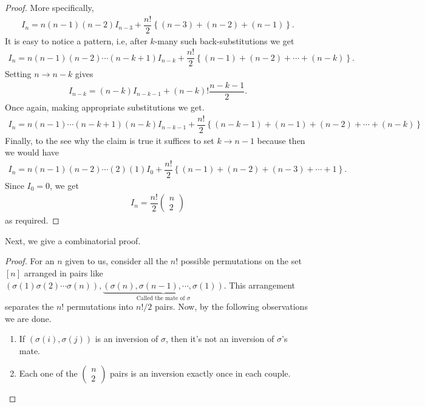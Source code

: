\begin{proof}
More specifically,
\begin{align*}
	I_n = n(n-1)(n-2)I_{n-3} + \dfrac{n!}{2}\left\{(n-3)+(n-2)+(n-1)\right\}.
\end{align*}
It is easy to notice a pattern, i.e, after $k$-many such back-substitutions we get
\begin{align*}
	I_n = n(n-1)(n-2)\cdots(n-k+1)I_{n-k} + \dfrac{n!}{2}\left\{(n-1)+(n-2)+\cdots+(n-k)\right\}.
\end{align*}
Setting $n\to n-k$ gives
\begin{align*}
	I_{n-k}=(n-k)I_{n-k-1} + (n-k)!\dfrac{n-k-1}{2}.
\end{align*}
Once again, making appropriate substitutions we get.
\begin{align*}
I_n = n(n-1)\cdots(n-k+1)(n-k)I_{n-k-1}+\dfrac{n!}{2}\left\{(n-k-1)+(n-1)+(n-2)+\cdots+(n-k)\right\}
\end{align*}
Finally, to the see why the claim is true it suffices to set $k\to n-1$ because then we would have 
\begin{align*}
	I_n = n(n-1)(n-2)\cdots (2)(1)I_{0} + \dfrac{n!}{2}\left\{ (n-1)+(n-2)+(n-3)+\cdots+1\right\}.
\end{align*}
Since $I_0=0$, we get
\begin{align*}
	I_n = \dfrac{n!}{2}\left(\begin{array}{c}n\\ 2\end{array}\right) 
\end{align*}
as required. 
\end{proof}
Next, we give a combinatorial proof. 
\begin{proof}
For an $n$ given to us, consider all the $n!$ possible permutations on the set $[n]$ arranged in pairs like $(\sigma(1)\sigma(2)\cdots\sigma(n)), \underbrace{(\sigma(n),\sigma(n-1),\cdots,\sigma(1))}_{\text{Called the mate of } \sigma}$. This arrangement separates the $n!$ permutations into $n!/2$ pairs. Now, by the following observations we are done.
\begin{enumerate}
	\item If $(\sigma(i),\sigma(j))$ is an inversion of $\sigma$, then it's not an inversion of $\sigma$'s mate.
	\item Each one of the $\left(\begin{array}{c}n\\ 2\end{array}\right)$ pairs is an inversion exactly once in each couple.
\end{enumerate}
\end{proof}
